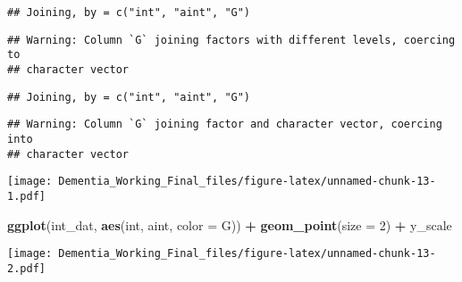 \documentclass[]{article}
\newenvironment{Shaded}{\begin{snugshade}}{\end{snugshade}}
\newcommand{\DataTypeTok}[1]{\textcolor[rgb]{0.13,0.29,0.53}{#1}}
\newcommand{\DecValTok}[1]{\textcolor[rgb]{0.00,0.00,0.81}{#1}}
\newcommand{\KeywordTok}[1]{\textcolor[rgb]{0.13,0.29,0.53}{\textbf{#1}}}
\newcommand{\NormalTok}[1]{#1}
\newcommand{\OperatorTok}[1]{\textcolor[rgb]{0.81,0.36,0.00}{\textbf{#1}}}
\newcommand{\StringTok}[1]{\textcolor[rgb]{0.31,0.60,0.02}{#1}}
\begin{document}
\begin{verbatim}
## Joining, by = c("int", "aint", "G")
\end{verbatim}

\begin{verbatim}
## Warning: Column `G` joining factors with different levels, coercing to
## character vector
\end{verbatim}

\begin{verbatim}
## Joining, by = c("int", "aint", "G")
\end{verbatim}

\begin{verbatim}
## Warning: Column `G` joining factor and character vector, coercing into
## character vector
\end{verbatim}

\begin{Shaded}
\end{Shaded}

\texttt{[image: Dementia\_Working\_Final\_files/figure-latex/unnamed-chunk-13-1.pdf]}

\begin{Shaded}
\begin{Highlighting}[]
\KeywordTok{ggplot}\NormalTok{(int_dat, }\KeywordTok{aes}\NormalTok{(int, aint, }\DataTypeTok{color =}\NormalTok{ G)) }\OperatorTok{+}\StringTok{ }\KeywordTok{geom_point}\NormalTok{(}\DataTypeTok{size =} \DecValTok{2}\NormalTok{) }\OperatorTok{+}\StringTok{ }\NormalTok{y_scale}
\end{Highlighting}
\end{Shaded}

\texttt{[image: Dementia\_Working\_Final\_files/figure-latex/unnamed-chunk-13-2.pdf]}

\begin{Shaded}
\end{Shaded}
\end{document}
